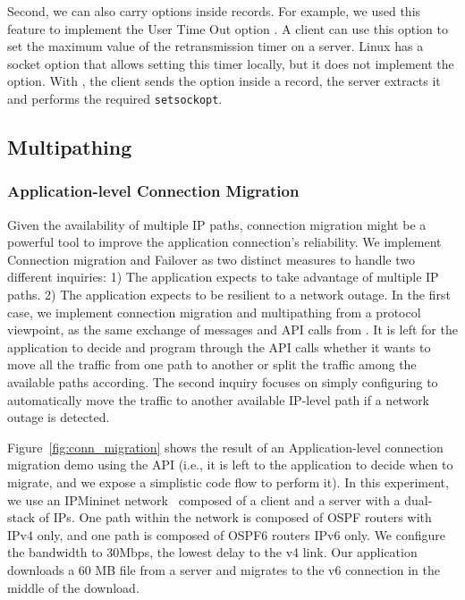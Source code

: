 Second, we can also carry \tcp options inside \tls records. For example, we used
this feature to implement the \tcp User Time Out option \cite{rfc5482}. A client
can use this option to set the maximum value of the retransmission
timer on a server. Linux \tcp has a socket option that allows setting
this timer locally, but it does not implement the option. With \tcpls, the client sends the option inside a \tls record, the server extracts it
and performs the required \texttt{setsockopt}.

\subsection{Multipathing}

\subsubsection{Application-level Connection Migration}
\label{sec:connmigr}

Given the availability of multiple IP paths, connection migration might be a
powerful tool to improve the application connection's reliability.  We
implement Connection migration and Failover as two distinct measures to handle
two different inquiries: 1) The application expects to take advantage of multiple
IP paths. 2) The application expects to be resilient to a network outage. In the
first case, we implement connection migration and multipathing from a
protocol viewpoint, as the same exchange of messages and API calls from \tcpls.
It is left for the application to decide and program
through the API calls whether it wants to move all the traffic from one path to
another or split the traffic among the available paths according. The second
inquiry focuses on simply configuring \tcpls to automatically move the traffic to
another available IP-level path if a network outage is detected.

Figure~\ref{fig:conn_migration} shows the result of an Application-level
connection migration demo using the API (i.e., it is left to the
application to decide when to migrate, and we expose a simplistic code flow to
perform it). In this experiment, we use an IPMininet network~\cite{ipmininet, jadin2020educational}
composed of a client and a server with a dual-stack of IPs. One path within the
network is composed of OSPF routers with IPv4 only, and one path is composed of
OSPF6 routers IPv6 only. We configure the bandwidth to 30Mbps, the lowest delay
to the v4 link. Our application
downloads a 60 MB file from a server and migrates to the v6 connection in
the middle of the download.

